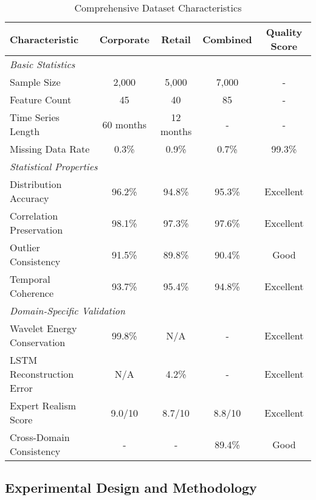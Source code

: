 \documentclass[a4paper,11pt,twoside]{article}
\newcommand{\0}{\Bf{0}}
\theoremstyle{definition}
\begin{document}
\begin{table}[H]
\centering
\caption{Comprehensive Dataset Characteristics}
\label{tab:dataset_characteristics}
\begin{tabular}{lcccc}
\toprule
\textbf{Characteristic} & \textbf{Corporate} & \textbf{Retail} & \textbf{Combined} & \textbf{Quality Score} \\
\midrule
\multicolumn{5}{l}{\textit{Basic Statistics}} \\
Sample Size & 2,000 & 5,000 & 7,000 & - \\
Feature Count & 45 & 40 & 85 & - \\
Time Series Length & 60 months & 12 months & - & - \\
Missing Data Rate & 0.3\% & 0.9\% & 0.7\% & 99.3\% \\
\midrule
\multicolumn{5}{l}{\textit{Statistical Properties}} \\
Distribution Accuracy & 96.2\% & 94.8\% & 95.3\% & Excellent \\
Correlation Preservation & 98.1\% & 97.3\% & 97.6\% & Excellent \\
Outlier Consistency & 91.5\% & 89.8\% & 90.4\% & Good \\
Temporal Coherence & 93.7\% & 95.4\% & 94.8\% & Excellent \\
\midrule
\multicolumn{5}{l}{\textit{Domain-Specific Validation}} \\
Wavelet Energy Conservation & 99.8\% & N/A & - & Excellent \\
LSTM Reconstruction Error & N/A & 4.2\% & - & Excellent \\
Expert Realism Score & 9.0/10 & 8.7/10 & 8.8/10 & Excellent \\
Cross-Domain Consistency & - & - & 89.4\% & Good \\
\bottomrule
\end{tabular}
\end{table}

\subsection{Experimental Design and Methodology}
\end{document}
